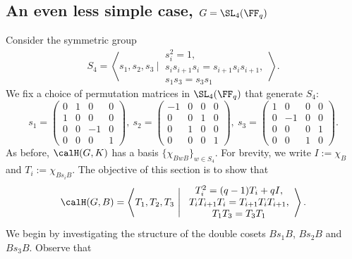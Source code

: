 \documentclass[11pt]{amsart}
\theoremstyle{remark}
\begin{document}

\subsection{An even less simple case, $G=\SL_4(\FF_q)$}\label{Section3.4}
Consider the symmetric group
\[
	S_4 = \left\langle s_1,s_2,s_3\ \Bigg|\ \begin{array}{c} s_i^2=1,\\ s_is_{i+1}s_i=s_{i+1}s_is_{i+1},\\ s_1s_3=s_3s_1\end{array}\right\rangle.
\]
We fix a choice of permutation matrices in $\SL_4(\FF_q)$ that generate $S_4$:
\[
	s_1 =
	\begin{pmatrix}
		0 & 1 & 0  & 0 \\
		1 & 0 & 0  & 0 \\
		0 & 0 & -1 & 0 \\
		0 & 0 & 0  & 1
	\end{pmatrix}, \
	s_2 =
	\begin{pmatrix}
		-1 & 0 & 0 & 0 \\
		0  & 0 & 1 & 0 \\
		0  & 1 & 0 & 0 \\
		0  & 0 & 0 & 1
	\end{pmatrix}, \
	s_3 =
	\begin{pmatrix}
		1 & 0  & 0 & 0 \\
		0 & -1 & 0 & 0 \\
		0 & 0  & 0 & 1 \\
		0 & 0  & 1 & 0
	\end{pmatrix}.
\]
As before, $\calH(G,K)$ has a basis $\{\chi_{BwB}\}_{w\in S_4}$.
For brevity, we write $I:=\chi_B$ and $T_i:= \chi_{Bs_iB}$.
The objective of this section is to show that
\[
	\calH(G,B) = \left\langle T_1,T_2,T_3\ \Bigg|\ \begin{array}{c}
		T_i^2 = (q-1)T_i + qI,             \\
		T_iT_{i+1}T_i = T_{i+1}T_iT_{i+1}, \\
		T_1T_3=T_3T_1
	\end{array}\right\rangle.
\]
We begin by investigating the structure of the double cosets $Bs_1B$, $Bs_2B$ and $Bs_3B$.
Observe that
\end{document}
